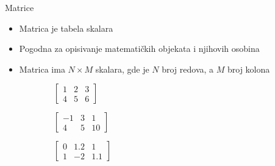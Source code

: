 \documentclass[bookmarks=true,bookmarksopen=true,pdfborder={0 0 0},pdfhighlight={/N},linkbordercolor={.5 .5 .5},implicit=false,unicode,xcolor={table}]{beamer}
\begin{document}
\begin{frame}{Matrice}

  \begin{itemize}
    \item Matrica je tabela skalara
    \item Pogodna za opisivanje matematičkih objekata i njihovih osobina
    \item Matrica ima $N\times M$ skalara, gde je $N$ broj redova, a $M$ broj kolona
  \end{itemize}
  \begin{figure}
    \begin{subfigure}{3cm}
      $\begin{bmatrix}
        1 & 2 & 3\\
        4 & 5 & 6
        \end{bmatrix}$
    \end{subfigure}
    \begin{subfigure}{3cm}
      $\begin{bmatrix}
        -1 & 3 & 1\\
        4 & 5 & 10
        \end{bmatrix}$
    \end{subfigure}
    \begin{subfigure}{3cm}
      $\begin{bmatrix}
        0 & 1.2 & 1\\
        1 & -2 & 1.1
        \end{bmatrix}$
    \end{subfigure}
  \end{figure}

\end{frame}
\end{document}

